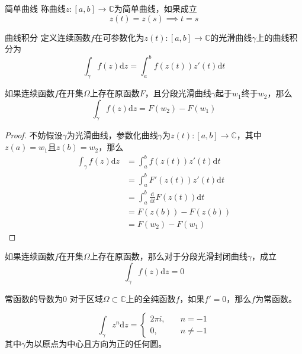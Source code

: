 \documentclass[lang = cn, scheme = chinese, thmcnt = section]{elegantbook}
\newcommand{\C}{\mathbb{C}}  		   %
\newcommand{\sub}{\subset}             %
\newcommand{\dd}{\mathrm{d}}           %
\begin{document}
\begin{definition}{简单曲线}
	称曲线$z:[a,b]\to \C$为简单曲线，如果成立%
	$$
	z(t)=z(s)\implies
	t=s
	$$
\end{definition}

\begin{definition}{曲线积分}
	定义连续函数$f$在可参数化为$z(t):[a,b]\to\C$的光滑曲线$\gamma$上的曲线积分为
	$$
	\int_{\gamma}{f(z)\mathrm{d}z}=\int_a^b{f(z(t))z'(t)\mathrm{d}t}
	$$
\end{definition}

\begin{theorem}
	如果连续函数$f$在开集$\Omega$上存在原函数$F$，且分段光滑曲线$\gamma$起于$w_1$终于$w_2$，那么
	$$
	\int_{\gamma}{f(z)\mathrm{d}z}=F(w_2)-F(w_1)
	$$
\end{theorem}

\begin{proof}
	不妨假设$\gamma$为光滑曲线，参数化曲线$\gamma$为$z(t):[a,b]\to\C$，其中$z(a)=w_1$且$z(b)=w_2$，那么
	\begin{align*}
		\int_{\gamma}{f(z)\mathrm{d}z}
		& = \int_a^b{f(z(t))z'(t)}\mathrm{d}t\\
		& = \int_a^b{F'(z(t))z'(t)}\mathrm{d}t\\
		& = \int_a^b \frac{\dd}{\dd t}F(z(t))\dd t\\
		& = F(z(b))-F(z(b))\\
		& = F(w_2)-F(w_1)
	\end{align*}
\end{proof}

\begin{corollary}
	如果连续函数$f$在开集$\Omega$上存在原函数，那么对于分段光滑封闭曲线$\gamma$，成立
	$$
	\int_{\gamma}{f(z)\mathrm{d}z}=0
	$$
\end{corollary}

\begin{corollary}{}{常函数的导数为0}
	对于区域$\Omega\sub\C$上的全纯函数$f$，如果$f'=0$，那么$f$为常函数。
\end{corollary}

\begin{proposition}
	$$
	\int_{\gamma}{z^n\mathrm{d}z}=\begin{cases}
		2\pi i,\quad & n=-1\\
		0,\quad & n\ne-1
	\end{cases}
	$$
	其中$\gamma$为以原点为中心且方向为正的任何圆。
\end{proposition}
\end{document}
